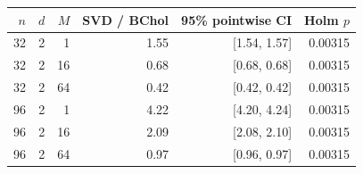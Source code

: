 \begin{tabular}{rrrrrr}
\toprule
$n$ & $d$ & $M$ & SVD / BChol & 95\% pointwise CI & Holm $p$ \\
\midrule
32 & 2 & 1 & 1.55 & [1.54, 1.57] & 0.00315 \\
32 & 2 & 16 & 0.68 & [0.68, 0.68] & 0.00315 \\
32 & 2 & 64 & 0.42 & [0.42, 0.42] & 0.00315 \\
96 & 2 & 1 & 4.22 & [4.20, 4.24] & 0.00315 \\
96 & 2 & 16 & 2.09 & [2.08, 2.10] & 0.00315 \\
96 & 2 & 64 & 0.97 & [0.96, 0.97] & 0.00315 \\
\bottomrule
\end{tabular}
